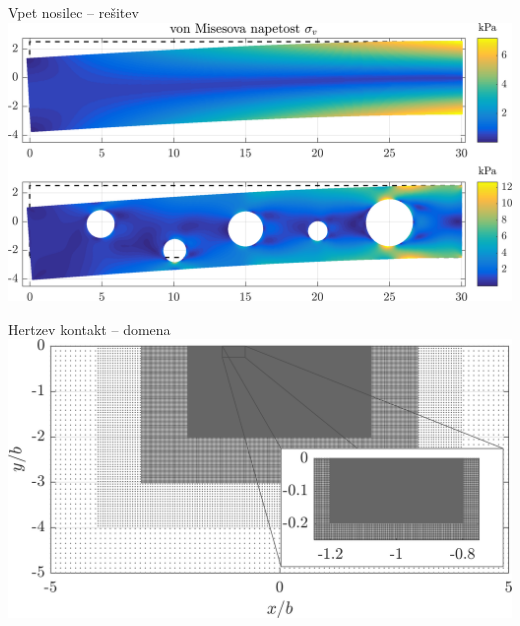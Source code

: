 

\begin{frame}{Vpet nosilec -- rešitev}
  \centering
  \vspace{3ex}
  \includegraphics[width=\textwidth]{resources/cantilever_beam_with_holes.png}
\end{frame}

\begin{frame}{Hertzev kontakt -- domena}
  \centering
  \vspace{3ex}
  \includegraphics[width=\textwidth]{resources/hertzian_refined_domain.png}
\end{frame}

